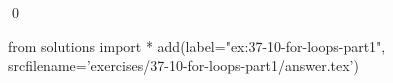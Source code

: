 
\begin{ex}
  \label{ex:37-10-for-loops-part1}
  
  \qed
\end{ex}
\begin{python0}
from solutions import *
add(label="ex:37-10-for-loops-part1",
    srcfilename='exercises/37-10-for-loops-part1/answer.tex')
\end{python0}
